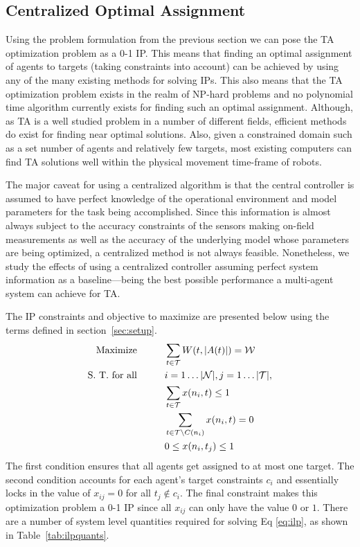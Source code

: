 \documentclass[defaultstyle,12pt]{thesis}
\newcommand{\Pl}{\mathcal{N}} %
\newcommand{\Ta}{\mathcal{T}} %
\newcommand{\We}{\mathcal{W}} %
\begin{document}
\subsection{Centralized Optimal Assignment}
Using the problem formulation from the previous section we can pose the TA optimization problem as a 0-1 IP. This means that finding an optimal assignment of agents to targets (taking constraints into account) can be achieved by using any of the many existing methods for solving IPs. This also means that the TA optimization problem exists in the realm of NP-hard problems and no polynomial time algorithm currently exists for finding such an optimal assignment. Although, as TA is a well studied problem in a number of different fields, efficient methods do exist for finding near optimal solutions. Also, given a constrained domain such as a set number of agents and relatively few targets, most existing computers can find TA solutions well within the physical movement time-frame of robots. 

The major caveat for using a centralized algorithm is that the central controller is assumed to have perfect knowledge of the operational environment and model parameters for the task being accomplished. Since this information is almost always subject to the accuracy constraints of the sensors making on-field measurements as well as the accuracy of the underlying model whose parameters are being optimized, a centralized method is not always feasible. Nonetheless, we study the effects of using a centralized controller assuming perfect system information as a baseline---being the best possible performance a multi-agent system can achieve for TA.

The IP constraints and objective to maximize are presented below using the terms defined in section~\ref{sec:setup}. 
\begin{align}\label{eq:ilp}
	\text{Maximize}\hspace{1cm} & \sum\limits_{t \in \Ta} W(t, |A(t)|) = \We\\
	\text{S. T. for all}\hspace{1cm} & i = 1\ldots|\Pl|, j = 1\ldots|\Ta|,\notag\\
	& \sum\limits_{t \in \Ta} x(n_i, t) \leq 1\notag\\
	& \sum\limits_{t \in \Ta \backslash C(n_i)} x(n_i, t) = 0\notag\\
	& 0 \leq x(n_i, t_j) \leq 1\notag
\end{align}
The first condition ensures that all agents get assigned to at most one target. The second condition accounts for each agent's target constraints $c_i$ and essentially locks in the value of $x_{ij} = 0$ for all $t_j \not\in c_i$. The final constraint makes this optimization problem a 0-1 IP since all $x_{ij}$ can only have the value $0$ or $1$. There are a number of system level quantities required for solving Eq \eqref{eq:ilp}, as shown in Table~\ref{tab:ilpquants}.
\end{document}
